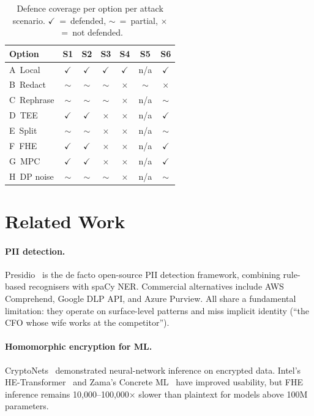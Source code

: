 \documentclass[11pt,a4paper]{article}
\begin{document}
\begin{table}[h]
\centering
\small
\caption{Defence coverage per option per attack scenario.
  $\checkmark$~=~defended, $\sim$~=~partial, $\times$~=~not defended.}
\label{tab:defence}
\begin{tabular}{lcccccc}
\toprule
Option & S1 & S2 & S3 & S4 & S5 & S6 \\
\midrule
A~Local     & $\checkmark$ & $\checkmark$ & $\checkmark$ & $\checkmark$ & n/a & $\checkmark$ \\
B~Redact    & $\sim$ & $\sim$ & $\sim$ & $\times$ & $\sim$ & $\times$ \\
C~Rephrase  & $\sim$ & $\sim$ & $\sim$ & $\times$ & n/a & $\sim$ \\
D~TEE       & $\checkmark$ & $\checkmark$ & $\times$ & $\times$ & n/a & $\checkmark$ \\
E~Split     & $\sim$ & $\sim$ & $\times$ & $\times$ & n/a & $\sim$ \\
F~FHE       & $\checkmark$ & $\checkmark$ & $\times$ & $\times$ & n/a & $\checkmark$ \\
G~MPC       & $\checkmark$ & $\checkmark$ & $\times$ & $\times$ & n/a & $\checkmark$ \\
H~DP noise  & $\sim$ & $\sim$ & $\sim$ & $\times$ & n/a & $\sim$ \\
\bottomrule
\end{tabular}
\end{table}

\section{Related Work}
\label{sec:related}

\paragraph{PII detection.}
Presidio~\cite{presidio} is the de facto open-source PII
detection framework, combining rule-based recognisers with spaCy
NER.  Commercial alternatives include AWS Comprehend, Google DLP
API, and Azure Purview.  All share a fundamental limitation: they
operate on surface-level patterns and miss implicit identity
(``the CFO whose wife works at the competitor'').

\paragraph{Homomorphic encryption for ML.}
CryptoNets~\cite{cryptonets} demonstrated neural-network
inference on encrypted data.  Intel's
HE-Transformer~\cite{he-transformer} and Zama's Concrete
ML~\cite{zama} have improved usability, but FHE inference
remains 10{,}000--100{,}000$\times$ slower than plaintext for
models above 100M parameters.
\end{document}

